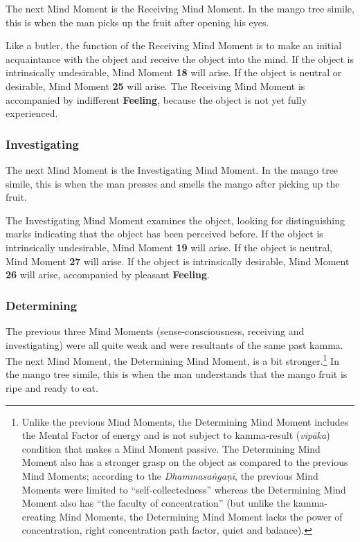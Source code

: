 The next Mind Moment is the Receiving Mind Moment. In the mango tree simile, this is when the man picks up the fruit after opening his eyes.

Like a butler, the function of the Receiving Mind Moment is to make an initial acquaintance with the object and receive the object into the mind. If the object is intrinsically undesirable, Mind Moment \textbf{18} will arise. If the object is neutral or desirable, Mind Moment \textbf{25} will arise. The Receiving Mind Moment is accompanied by indifferent \textbf{Feeling}, because the object is not yet fully experienced.

\subsubsection*{Investigating}

The next Mind Moment is the Investigating Mind Moment. In the mango tree simile, this is when the man presses and smells the mango after picking up the fruit.

The Investigating Mind Moment examines the object, looking for distinguishing marks indicating that the object has been perceived before. If the object is intrinsically undesirable, Mind Moment \textbf{19} will arise. If the object is neutral, Mind Moment \textbf{27} will arise. If the object is intrinsically desirable, Mind Moment \textbf{26} will arise, accompanied by pleasant \textbf{Feeling}.

\subsubsection*{Determining}

The previous three Mind Moments (sense-consciousness, receiving and investigating) were all quite weak and were resultants of the same past kamma. The next Mind Moment, the Determining Mind Moment, is a bit stronger.\footnote{Unlike the previous Mind Moments, the Determining Mind Moment includes the Mental Factor of energy and is not subject to kamma-result (\textit{vipāka}) condition that makes a Mind Moment passive. The Determining Mind Moment also has a stronger grasp on the object as compared to the previous Mind Moments; according to the \textit{Dhammasaṅgaṇī}, the previous Mind Moments were limited to “self-collectedness” whereas the Determining Mind Moment also has “the faculty of concentration” (but unlike the kamma-creating Mind Moments, the Determining Mind Moment lacks the power of concentration, right concentration path factor, quiet and balance).} In the mango tree simile, this is when the man understands that the mango fruit is ripe and ready to eat.

